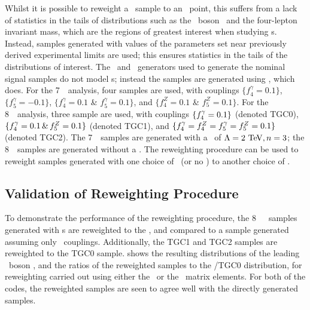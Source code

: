 Whilst it is possible to reweight a \sm\ sample to an \TGC\ point, this suffers
from a lack of statistics in the tails of distributions such as the \Z\ boson
\pt\ and the four-lepton invariant mass, which are the regions of greatest
interest when studying \TGC s. Instead, samples generated with values of the
\TGC parameters set near previously derived experimental limits are used; this
ensures statistics in the tails of the distributions of interest. The
\powhegbox\ and \ggZZ\ generators used to generate the nominal signal samples do
not model \TGC s; instead the samples are generated using \sherpa, which does.
For the 7~\tev\ analysis, four samples are used, with couplings
$\{f_{4}^{\gamma}=0.1\}$, $\{f_{5}^{\gamma}=-0.1\}$, $\{f_{4}^{\gamma}=0.1$ \&
$f_{5}^{\gamma}=0.1\}$, and $\{f_{4}^{Z}=0.1$ \& $f_5^{Z}=0.1\}$. For the
8~\tev\ analysis, three sample are used, with couplings $\{f_{4}^{\gamma}=0.1\}$
(denoted TGC0), $\{f_{4}^{\gamma}=0.1 \,\&\, f_{5}^{Z}=0.1\}$ (denoted TGC1), and $\{
f_{4}^{\gamma} = f_{4}^{Z} = f_{5}^{\gamma} = f_{5}^{Z} = 0.1 \}$ (denoted TGC2). The 7~\tev\
samples are generated with a \formfactor\ of $\Lambda=2\tev,n=3$; the 8~\tev\
samples are generated without a \formfactor. The reweighting procedure can be
used to reweight samples generated with one choice of \formfactor\ (or no
\formfactor) to another choice of \formfactor.

\subsection{Validation of Reweighting Procedure}
\label{sec:TGC-ReweightingValidation}

To demonstrate the performance of the reweighting procedure, the 8~\tev\
\sherpa\ samples generated with \TGC s are reweighted to the \sm, and compared
to a sample generated assuming only \sm\ couplings. Additionally, the TGC1 and
TGC2 samples are reweighted to the TGC0 sample. \fig{TGC-reweight} shows the
resulting distributions of the leading \Z\ boson \pt, and the ratios of the
reweighted samples to the \sm/TGC0 distribution, for reweighting carried out
using either the \BHO\ or the \BR\ matrix elements. For both of the codes, the
reweighted samples are seen to agree well with the directly generated samples.

